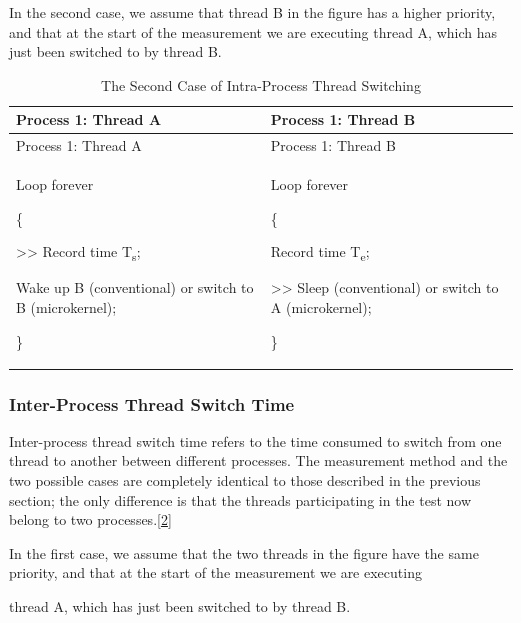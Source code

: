 In the second case, we assume that thread B in the figure has a higher priority, and that at the start of the measurement we are executing thread A, which has just been switched to by thread B.

\begin{xltabular}{\textwidth}{@{}>{\hsize\raggedright\arraybackslash}X>{\hsize\raggedright\arraybackslash}X@{}}
\caption{The Second Case of Intra-Process Thread Switching}\label{tab:1-2-intra-process-thread-switch-case-2}\\
\toprule
Process 1: Thread A & Process 1: Thread B\tabularnewline
\endfirsthead
\toprule
Process 1: Thread A & Process 1: Thread B\tabularnewline
\midrule
\endhead
\bottomrule
\endlastfoot
Loop forever

\{

\textgreater\textgreater{} Record time T\textsubscript{s};

Wake up B (conventional) or switch to B (microkernel);

\}\strut
 & Loop forever

\{

Record time T\textsubscript{e};

\textgreater\textgreater{} Sleep (conventional) or switch to A (microkernel);

\}\strut
\tabularnewline
\end{xltabular}
\nopagebreak[4]

\subsubsection{Inter-Process Thread Switch Time}\label{subsubsec:1-inter-process-thread-switch}

Inter-process thread switch time refers to the time consumed to switch from one thread to another between different processes. The measurement method and the two possible cases are completely identical to those described in the previous section; the only difference is that the threads participating in the test now belong to two processes.\hyperref[cite:1-2]{{[}2{]}}

In the first case, we assume that the two threads in the figure have the same priority, and that at the start of the measurement we are executing

thread A, which has just been switched to by thread B.


